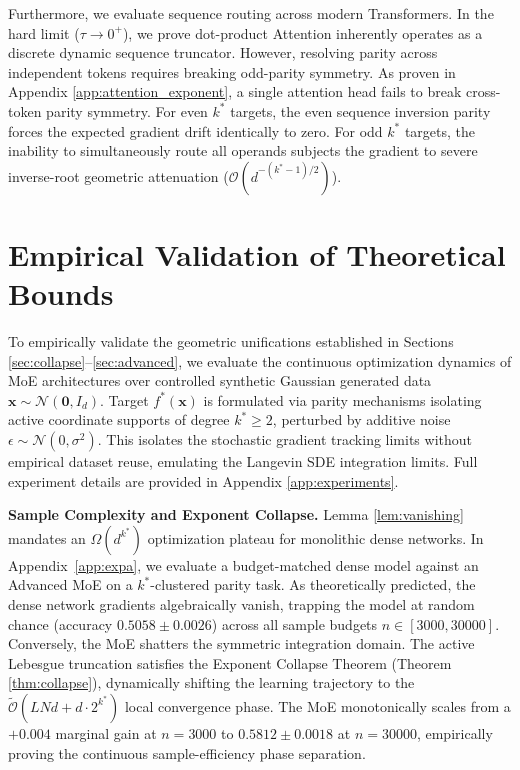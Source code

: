 \documentclass{article}
\newcommand{\1}{\mathbb{I}}
\newcommand{\calO}{\mathcal{O}}
\newcommand{\bx}{\mathbf{x}}
\newcommand{\calN}{\mathcal{N}}
\begin{document}
Furthermore, we evaluate sequence routing across modern Transformers. In the hard limit ($\tau \to 0^+$), we prove dot-product Attention \citep{vaswani2017attention} inherently operates as a discrete dynamic sequence truncator. However, resolving parity across independent tokens requires breaking odd-parity symmetry. As proven in Appendix \ref{app:attention_exponent}, a single attention head fails to break cross-token parity symmetry. For even $k^*$ targets, the even sequence inversion parity forces the expected gradient drift identically to zero. For odd $k^*$ targets, the inability to simultaneously route all operands subjects the gradient to severe inverse-root geometric attenuation ($\calO(d^{-(k^*-1)/2})$).


\section{Empirical Validation of Theoretical Bounds}
\label{sec:experiments}

To empirically validate the geometric unifications established in Sections \ref{sec:collapse}--\ref{sec:advanced}, we evaluate the continuous optimization dynamics of MoE architectures over controlled synthetic Gaussian generated data $\bx \sim \calN(\mathbf{0}, I_d)$. Target $f^*(\bx)$ is formulated via parity mechanisms isolating active coordinate supports of degree $k^* \ge 2$, perturbed by additive noise $\epsilon \sim \calN(0, \sigma^2)$. This isolates the stochastic gradient tracking limits without empirical dataset reuse, emulating the Langevin SDE integration limits. Full experiment details are provided in Appendix \ref{app:experiments}.

\textbf{Sample Complexity and Exponent Collapse.} Lemma \ref{lem:vanishing} mandates an $\Omega(d^{k^*})$ optimization plateau for monolithic dense networks. In Appendix~\ref{app:expa}, we evaluate a budget-matched dense model against an Advanced MoE on a $k^*$-clustered parity task. As theoretically predicted, the dense network gradients algebraically vanish, trapping the model at random chance (accuracy $0.5058 \pm 0.0026$) across all sample budgets $n \in [3000, 30000]$. Conversely, the MoE shatters the symmetric integration domain. The active Lebesgue truncation satisfies the Exponent Collapse Theorem (Theorem \ref{thm:collapse}), dynamically shifting the learning trajectory to the $\tilde{\calO}(LNd + d \cdot 2^{k^*})$ local convergence phase. The MoE monotonically scales from a $+0.004$ marginal gain at $n=3000$ to $0.5812 \pm 0.0018$ at $n=30000$, empirically proving the continuous sample-efficiency phase separation.
\end{document}

